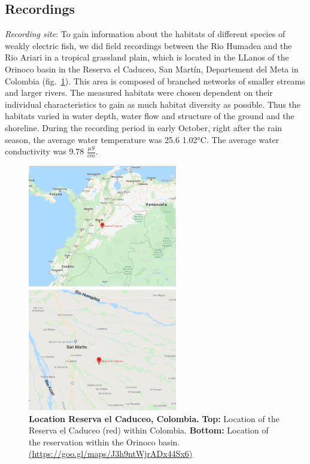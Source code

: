\subsection{Recordings}

\textit{Recording site}: To gain information about the habitats of different species of weakly electric fish, we did field recordings between the Rio Humadea and the Rio Ariari in a tropical grassland plain, which is located in the LLanos of the Orinoco basin in the Reserva el Caduceo, San Martín, Departement del Meta in Colombia (fig.~\ref{fig:map}). This area is composed of branched networks of smaller streams and larger rivers.
The measured habitats were chosen dependent on their individual characteristics to gain as much habitat diversity as possible. Thus the habitats varied in water depth, water flow and structure of the ground and the shoreline. During the recording period in early October, right after the rain season, the average water temperature was 25.6 \rpm \ang{1.02}C. The average water conductivity was 9.78  $\frac{\mu S}{cm}$.

\begin{figure}[H]
    \centering
    \includegraphics[width=0.58\textwidth]{pictures/Methods/map.png}
    \caption{\textbf{Location Reserva el Caduceo, Colombia.} \textbf{Top:} Location of the Reserva el Caduceo (red) within Colombia. \textbf{Bottom:} Location of the reservation within the Orinoco basin. \url{(https://goo.gl/maps/J3h9ntWjrADx44Sx6)}}
    \label{fig:map}
\end{figure}{}

